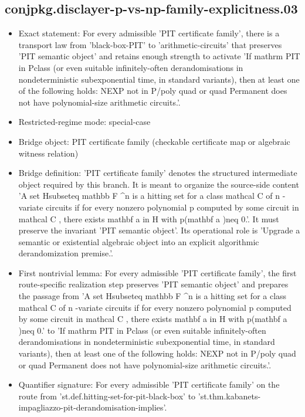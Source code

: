 \documentclass[11pt]{article}
\begin{document}
\subsection*{conjpkg.disclayer-p-vs-np-family-explicitness.03}
\begin{itemize}
\item Exact statement: For every admissible 'PIT certificate family', there is a transport law from 'black-box-PIT' to 'arithmetic-circuits' that preserves 'PIT semantic object' and retains enough strength to activate 'If mathrm PIT in Pclass (or even suitable infinitely-often derandomisations in nondeterministic subexponential time, in standard variants), then at least one of the following holds: NEXP not in P/poly quad or quad Permanent does not have polynomial-size arithmetic circuits.'.
\item Restricted-regime mode: special-case
\item Bridge object: PIT certificate family (checkable certificate map or algebraic witness relation)
\item Bridge definition: 'PIT certificate family' denotes the structured intermediate object required by this branch. It is meant to organize the source-side content 'A set Hsubseteq mathbb F \textasciicircum{}n is a hitting set for a class mathcal C of n -variate circuits if for every nonzero polynomial p computed by some circuit in mathcal C , there exists mathbf a in H with p(mathbf a )neq 0.'. It must preserve the invariant 'PIT semantic object'. Its operational role is 'Upgrade a semantic or existential algebraic object into an explicit algorithmic derandomization premise.'.
\item First nontrivial lemma: For every admissible 'PIT certificate family', the first route-specific realization step preserves 'PIT semantic object' and prepares the passage from 'A set Hsubseteq mathbb F \textasciicircum{}n is a hitting set for a class mathcal C of n -variate circuits if for every nonzero polynomial p computed by some circuit in mathcal C , there exists mathbf a in H with p(mathbf a )neq 0.' to 'If mathrm PIT in Pclass (or even suitable infinitely-often derandomisations in nondeterministic subexponential time, in standard variants), then at least one of the following holds: NEXP not in P/poly quad or quad Permanent does not have polynomial-size arithmetic circuits.'.
\item Quantifier signature: For every admissible 'PIT certificate family' on the route from 'st.def.hitting-set-for-pit-black-box' to 'st.thm.kabanets-impagliazzo-pit-derandomisation-implies'.

\end{itemize}
\end{document}
